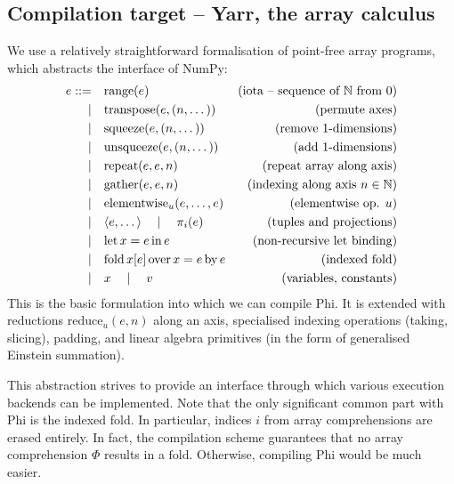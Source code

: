 \subsection{Compilation target -- Yarr, the array calculus}


We use a relatively straightforward formalisation of point-free array programs, which abstracts the interface of NumPy:
\begin{align*}
e ::=&\quad \mathrm{range}(e)   &\text{(iota -- sequence of }\mathbb N\text{ from }0\text{)} \\
\mid&\quad \mathrm{transpose}(e, (n, \dots)) &\text{(permute axes)} \\ 
\mid&\quad \mathrm{squeeze}(e, (n, \dots)) &\text{(remove 1-dimensions)} \\
\mid&\quad \mathrm{unsqueeze}(e, (n, \dots)) &\text{(add 1-dimensions)} \\
\mid&\quad \mathrm{repeat}(e, e, n) &\text{(repeat array along axis)} \\
\mid&\quad \mathrm{gather}(e, e, n) &\text{(indexing along axis }n \in \mathbb N\text{)} \\ 
\mid&\quad \mathrm{elementwise}_u(e, \dots, e) &\text{(elementwise op. }u\text{)} \\
\mid&\quad \langle e, \dots \rangle \quad\mid\quad \pi_i(e) &\text{(tuples and projections)} \\
\mid&\quad \mathrm{let}\,{x}={e}\,\mathrm{in}\,{e} &\text{(non-recursive let binding)} \\
\mid&\quad \mathrm{fold}\,{x}[{e}]\,\mathrm{over}\,{x} = {e}\,\mathrm{by}\,{e} &\text{(indexed fold)} \\
\mid&\quad x \quad\mid\quad v  &\text{(variables, constants)}
\end{align*}
This is the basic formulation into which we can compile Phi. It is extended with reductions $\mathrm{reduce}_u(e, n)$ along an axis, specialised indexing operations (taking, slicing), padding, and linear algebra primitives (in the form of generalised Einstein summation).

This abstraction strives to provide an interface through which various execution backends can be implemented. Note that the only significant common part with Phi is the indexed fold. In particular, indices $i$ from array comprehensions are erased entirely. In fact, the compilation scheme guarantees that no array comprehension $\Phi$ results in a $\mathrm{fold}$. Otherwise, compiling Phi would be much easier.

